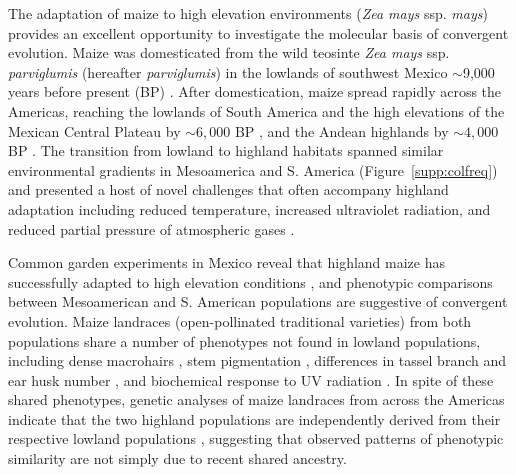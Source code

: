 The adaptation of maize to high elevation environments (\emph{Zea mays} ssp. \emph{mays}) provides an excellent opportunity to investigate the molecular basis of convergent evolution.  
Maize was domesticated from the wild teosinte \emph{Zea mays} ssp. \emph{parviglumis} (hereafter \emph{parviglumis}) in the lowlands of southwest Mexico $\sim$9,000 years before present (BP) \cite[]{Matsuoka_2002_11983901,Piperno_2009_19307570,vanHeerwaarden_2011_21189301}. 
After domestication, maize spread rapidly across the Americas, reaching the lowlands of South America and the high elevations of the Mexican Central Plateau by $\sim 6,000$ BP \cite[]{Piperno_2006_69}, and the Andean highlands by $\sim 4,000$ BP \cite[]{Perry_2006_16511492,Grobman_2012_22307642}. 
The transition from lowland to highland habitats spanned similar environmental gradients in Mesoamerica and S. America (Figure~\ref{supp:colfreq}) and presented a host of novel challenges that often accompany highland adaptation including reduced temperature, increased ultraviolet radiation, and reduced partial pressure of atmospheric gases \cite[]{Korner_2007_17988759}.

Common garden experiments in Mexico reveal that highland maize has successfully adapted to high elevation conditions \cite[]{Mercer2008}, and phenotypic comparisons between Mesoamerican and S. American populations are suggestive of convergent evolution.  
Maize landraces (open-pollinated traditional varieties) from both populations share a number of phenotypes not found in lowland populations, including dense macrohairs \cite[]{Wilkes_1977,Wellhausen1957:book}, stem pigmentation \cite[]{Wilkes_1977,Wellhausen1957:book}, differences in tassel branch and ear husk number \cite[]{brewbaker2014diversity}, and biochemical response to UV radiation \cite[]{Casati2005}. 
In spite of these shared phenotypes, genetic analyses of maize landraces from across the Americas indicate that the two highland populations are independently derived from their respective lowland populations \cite[]{Vigouroux_2008_21632329, vanHeerwaarden_2011_21189301}, suggesting that observed patterns of phenotypic similarity are not simply due to recent shared ancestry. 

